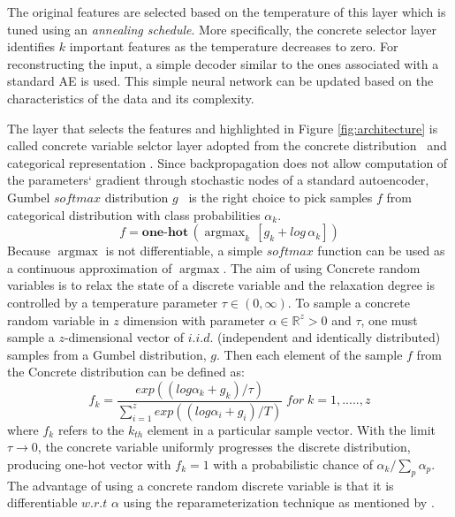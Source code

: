 \documentclass{bioinfo}
\newcommand{\R}{\mathbb{R}}
\DeclareMathOperator*{\argmax}{argmax}
\begin{document}
The original features are selected based on the temperature of this layer which is tuned using an \emph{annealing schedule}. More specifically, the concrete selector layer identifies $k$ important features as the temperature decreases to zero. 
For reconstructing the input, a simple decoder similar to the ones associated with a standard AE is used. 
This simple neural network can be updated based on the characteristics of the data and its complexity.

The layer that selects the features and highlighted in Figure \ref{fig:architecture} is called concrete variable selctor layer adopted from the concrete distribution~\citep{maddison2016concrete} and categorical representation \citep{jang2016categorical}. 
Since backpropagation does not allow computation of the parameters` gradient through stochastic nodes of a standard autoencoder, Gumbel $softmax$ distribution $g$~\citep{gumbel1954statistical} is the right choice to pick samples $f$ from categorical distribution with class probabilities $\alpha_k$. 
\begin{equation}
	f = \textbf{one-hot} \, (\argmax_k \, [g_k + log \, \alpha_k])
\end{equation}
Because $\argmax$ is not differentiable, a simple $softmax$ function can be used as a continuous approximation of $\argmax$. The aim of using Concrete random variables is to relax the state of a discrete variable and the relaxation degree is controlled by a temperature parameter $\tau \in (0, \infty)$. To sample a concrete random variable in $z$ dimension with parameter $\alpha \in \R ^z>0$ and $\tau$, one must sample a $z$-dimensional vector of $i.i.d.$ (independent and identically distributed) samples from a Gumbel distribution, $g.$ Then each element of the sample $f$ from the Concrete distribution can be defined as:
\begin{equation}
    f_k = \frac{exp((log \alpha_k + g_k)/\tau)}{\sum_{i=1} ^z exp((log \alpha_i + g_i)/T) } \; for \; k = 1,.....,z
\end{equation}
where $f_k$ refers to the $k_{th}$ element in a particular sample vector. 
With the limit $\tau \to 0$, the concrete variable uniformly progresses the discrete distribution, producing one-hot vector with $f_k = 1$ with a probabilistic chance of $\alpha _k/\sum_p \alpha _p$.
The advantage of using a concrete random discrete variable is that it is differentiable $w.r.t$ $\alpha$ using the reparameterization technique as mentioned by \citep{kingma2013auto}.
\end{document}
